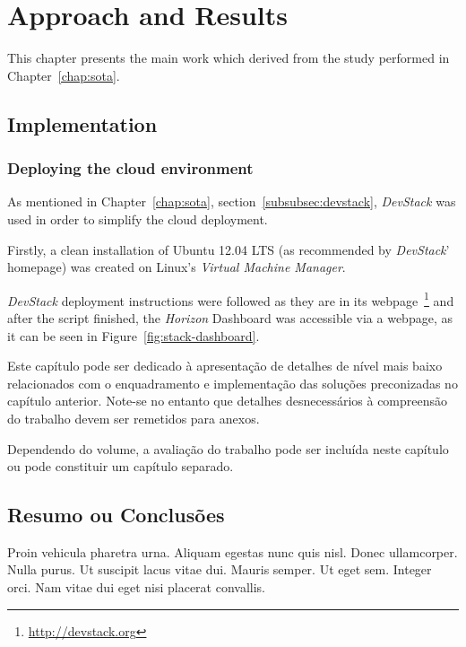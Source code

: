 \chapter{Approach and Results}\label{chap:chap4}


This chapter presents the main work which derived from the study performed in Chapter~\ref{chap:sota}.

\section*{}

\section{Implementation}\label{sec:implementation}

\subsection{Deploying the cloud environment}\label{subsec:cloud_env}

As mentioned in Chapter~\ref{chap:sota}, section~\ref{subsubsec:devstack}, \textit{DevStack} was used in order to simplify the cloud deployment.

Firstly, a clean installation of Ubuntu 12.04 LTS (as recommended by \textit{DevStack}' homepage) was created on Linux's \textit{Virtual Machine Manager}.

\textit{DevStack} deployment instructions were followed as they are in its webpage~\footnote{\url{http://devstack.org}} and after the script finished, the \textit{Horizon} Dashboard was accessible via a webpage, as it can be seen in Figure~\ref{fig:stack-dashboard}.






Este capítulo pode ser dedicado à apresentação de detalhes de nível
mais baixo relacionados com o enquadramento e implementação das
soluções preconizadas no capítulo anterior.
Note-se no entanto que detalhes desnecessários à compreensão do
trabalho devem ser remetidos para anexos.

Dependendo do volume, a avaliação do trabalho pode ser incluída neste
capítulo ou pode constituir um capítulo separado.

\section{Resumo ou Conclusões}

Proin vehicula pharetra urna. Aliquam egestas
nunc quis nisl. Donec ullamcorper. Nulla purus. Ut suscipit lacus
vitae dui. Mauris semper. Ut eget sem. Integer orci. Nam vitae dui
eget nisi placerat convallis. 
